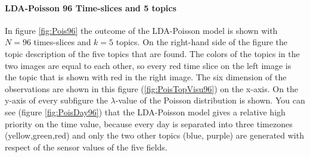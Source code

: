 \documentclass[a4paper,fleqn]{article}
\begin{document}
\paragraph{LDA-Poisson 96 Time-slices and 5 topics}
In figure \ref{fig:Pois96} the outcome of the LDA-Poisson model is shown with $N=96$ times-slices and $k=5$ topics. On the right-hand side of the figure the topic description of the five topics that are found. The colors of the topics in the two images are equal to each other, so every red time slice on the left image is the topic that is shown with red in the right image. The six dimension of the observations are shown in this figure (\ref{fig:PoisTopVisu96}) on the x-axis. On the y-axis of every subfigure the $\lambda$-value of the Poisson distribution is shown. You can see (figure \ref{fig:PoisDay96}) that the LDA-Poisson model gives a relative high priority on the time value, because every day is separated into three timezones (yellow,green,red) and only the two other topics (blue, purple) are generated with respect of the sensor values of the five fields.
\end{document}
